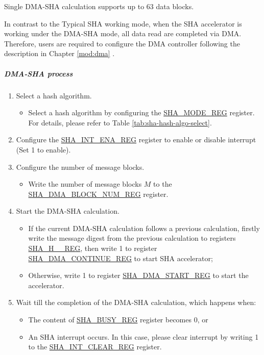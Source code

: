 \documentclass[main\_\_EN.tex]{subfiles}
\begin{document}
Single DMA-SHA calculation supports up to 63 data blocks.

In contrast to the Typical SHA working mode, when the SHA accelerator is working under the DMA-SHA mode, all data read are completed via DMA. Therefore, users are required to configure the DMA controller following the description in Chapter \ref{mod:dma} \textit{}.

\subparagraph{DMA-SHA process}

\begin{enumerate}
    \item Select a hash algorithm.
    \begin{itemize}
        \item Select a hash algorithm by configuring the \hyperref[regdesc:SHAMODEREG]{SHA\_MODE\_REG} register. For details, please refer to Table \ref{tab:sha-hash-algo-select}.
    \end{itemize}
    \item Configure the \hyperref[regdesc:SHAINTENAREG]{SHA\_INT\_ENA\_REG} register to enable or disable interrupt (Set 1 to enable).
    \item Configure the number of message blocks.
    \begin{itemize}
        \item  Write the number of message blocks \begin{math}M\end{math} to the  \hyperref[regdesc:SHADMABLOCKNUMREG]{SHA\_DMA\_BLOCK\_NUM\_REG} register.
    \end{itemize}
    \item Start the DMA-SHA calculation.
        \begin{itemize}
            \item If the current DMA-SHA calculation follows a previous calculation, firstly write the message digest from the previous calculation to registers \hyperref[regdesc:SHAHNREG]{SHA\_H\_\_REG}, then write 1 to register \hyperref[regdesc:SHADMACONTINUEREG]{SHA\_DMA\_CONTINUE\_REG} to start SHA accelerator;
            \item Otherwise, write 1 to register \hyperref[regdesc:SHADMASTARTREG]{SHA\_DMA\_START\_REG} to start the accelerator.
        \end{itemize}
    \item Wait till the completion of the DMA-SHA calculation, which happens when:
        \begin{itemize}
            \item The content of \hyperref[regdesc:SHABUSYREG]{SHA\_BUSY\_REG} register becomes 0, or
            \item An SHA interrupt occurs. In this case, please clear interrupt by writing 1 to the \hyperref[regdesc:SHAINTCLEARREG]{SHA\_INT\_CLEAR\_REG} register.
        \end{itemize}
    

\end{enumerate}
\end{document}
